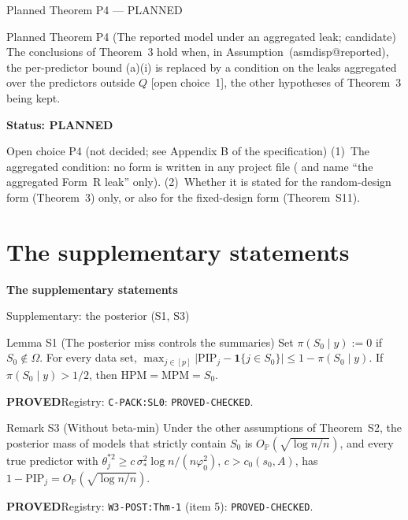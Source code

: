 \documentclass[aspectratio=169]{beamer}
\makeatletter
\newcommand{\asmdisp}[1]{\csname asmdisp@#1\endcsname}
\newcommand{\as}[1]{\textup{(\asmdisp{#1})}}
\newcommand{\ind}[1]{\mathbf{1}\{#1\}}
\newcommand{\set}[1]{[#1]}
\newcommand{\abs}[1]{\lvert #1\rvert}
\renewcommand{\P}{\mathbb{P}}
\newcommand{\OP}{O_{\P}}
\newcommand{\sigs}{\sigma_*}
\newcommand{\Sz}{S_0}
\newcommand{\sz}{s_0}
\newcommand{\rn}{\sqrt{\log n/n}}
\newcommand{\Om}{\Omega}
\newcommand{\pis}[1]{\pi(#1\mid y)}
\newcommand{\PIP}{\mathrm{PIP}}
\newcommand{\HPM}{\mathrm{HPM}}
\newcommand{\MPM}{\mathrm{MPM}}
\newcommand{\rid}[1]{\texttt{#1}}
\makeatother
\begin{document}
\begin{frame}{Planned Theorem P4 --- PLANNED}
\small
\begin{alertblock}{Planned Theorem P4 (The reported model under an aggregated leak; candidate)}
The conclusions of Theorem~3 hold when, in Assumption~\as{reported}, the per-predictor bound
(a)(i) is replaced by a condition on the leaks aggregated over the predictors outside $Q$
\textup{[open choice~1]}, the other hypotheses of Theorem~3 being kept.
\end{alertblock}
\medskip\noindent\textbf{Status: PLANNED}
\begin{block}{Open choice P4 (not decided; see Appendix B of the specification)}
(1)~The aggregated condition: no form is written in any project file ( and
 name ``the aggregated Form~R leak'' only). (2)~Whether it is stated for the random-design form
(Theorem~3) only, or also for the fixed-design form (Theorem~S11).
\end{block}
\end{frame}




\section{The supplementary statements}
\begin{frame}
\centering\Large\textbf{The supplementary statements}
\end{frame}

\begin{frame}{Supplementary: the posterior (S1, S3)}
\footnotesize
\begin{block}{Lemma S1 (The posterior miss controls the summaries)}
Set $\pis{\Sz}:=0$ if $\Sz\notin\Om$. For every data set, $\max_{j\in\set{p}}\abs{\PIP_j-\ind{j\in\Sz}}\le1-\pis{\Sz}$. If $\pis{\Sz}>1/2$, then
$\HPM=\MPM=\Sz$.
\end{block}
{\footnotesize \textbf{PROVED}\quad Registry: \rid{C-PACK:SL0}: \rid{PROVED-CHECKED}.}

\begin{block}{Remark S3 (Without beta-min)}
Under the other assumptions of Theorem~S2, the posterior mass of models that strictly contain $\Sz$ is
$\OP(\rn)$, and every true predictor with $\theta_j^{*2}\ge c\,\sigs^2\log n/(n\varphi_0^2)$, $c>c_0(\sz,A)$, has
$1-\PIP_j=\OP(\rn)$.
\end{block}
{\footnotesize \textbf{PROVED}\quad Registry: \rid{W3-POST:Thm-1} (item 5): \rid{PROVED-CHECKED}.}

\end{frame}
\end{document}
